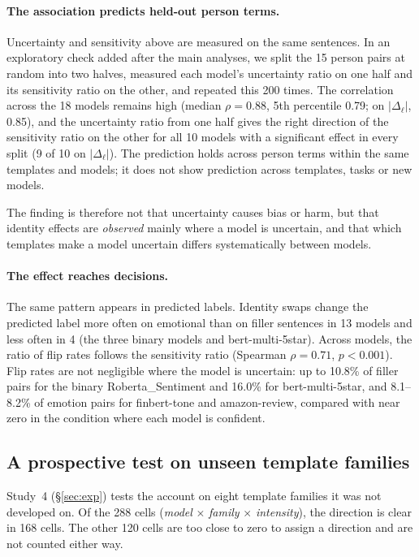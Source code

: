 \documentclass[runningheads]{llncs}
\begin{document}
\paragraph{The association predicts held-out person terms.} Uncertainty and
sensitivity above are measured on the same sentences. In an exploratory check
added after the main analyses, we split the 15 person pairs at random into two
halves, measured each model's uncertainty ratio on one half and its sensitivity
ratio on the other, and repeated this 200 times. The correlation across the 18
models remains high (median $\rho=0.88$, 5th percentile 0.79; on
$|\Delta_\ell|$, 0.85), and the uncertainty ratio from one half gives the right
direction of the sensitivity ratio on the other for all 10 models with a
significant effect in every split (9 of 10 on $|\Delta_\ell|$). The prediction
holds across person terms within the same templates and models; it does not
show prediction across templates, tasks or new models.

The finding is therefore not that uncertainty causes bias or harm, but that identity
effects are \emph{observed} mainly where a model is uncertain, and that which
templates make a model uncertain differs systematically between models.

\paragraph{The effect reaches decisions.} The same pattern appears in predicted
labels. Identity swaps change the predicted label more often on emotional than
on filler sentences in 13 models and less often in 4 (the three binary models
and bert-multi-5star). Across models, the ratio of flip rates follows the
sensitivity ratio (Spearman $\rho=0.71$, $p<0.001$). Flip rates are not
negligible where the model is uncertain: up to 10.8\% of filler pairs for the
binary Roberta\_Sentiment and 16.0\% for bert-multi-5star, and 8.1--8.2\% of
emotion pairs for finbert-tone and amazon-review, compared with near zero in the
condition where each model is confident.

\subsection{A prospective test on unseen template families}\label{sec:families}
Study~4 (\S\ref{sec:exp}) tests the account on eight template families it was
not developed on. Of the 288 cells (\emph{model} $\times$ \emph{family}
$\times$ \emph{intensity}), the direction is clear in 168 cells. The other 120
cells are too close to zero to assign a direction and are not counted either
way.
\end{document}
